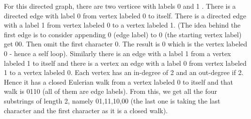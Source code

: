 For this directed graph, there are two verticee with labels 0 and 1 . There is a directed edge with label 0 from vertex labeled 0 to itself. There is a directed edge with a label 1 from vertex labeled 0 to a vertex labeled 1. (The idea behind the first edge is to consider appending 0 (edge label) to 0 (the starting vertex label) get 00. Then omit the first character 0. The result is 0 which is the vertex labeled 0 - hence a self loop). Similarly there is an edge with a label 1 from a vertex labeled 1 to itself and there is a vertex an edge with 
a label 0 from vertex labeled 1 to a vertex labeled 0.
Each vertex has an in-degree of 2 and an out-degree if 2. Hence it has a closed Eulerian walk from a vertex labeled 0 to itself and that walk is 0110 (all of them are edge labels). From this, we get all the four substrings of length 2, namely 01,11,10,00 (the last one is taking the last character and the first character as it is a closed walk).

